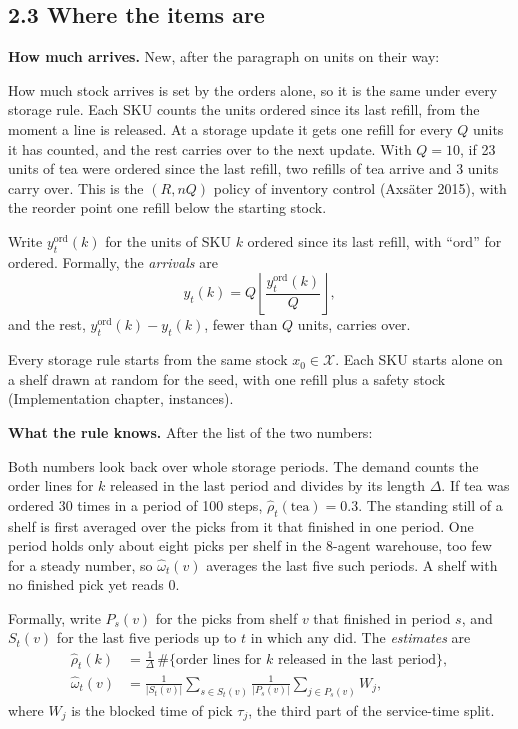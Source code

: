 \documentclass[11pt,a4paper]{article}
\newenvironment{greenblock}{\color{newc}}{}
\begin{document}
\subsection*{2.3 Where the items are}

\textbf{How much arrives.} New, after the paragraph on units on their way:

\begin{greenblock}
How much stock arrives is set by the orders alone, so it is the same under
every storage rule. Each SKU counts the units ordered since its last refill,
from the moment a line is released. At a storage update it gets one refill
for every $Q$ units it has counted, and the rest carries over to the next
update. With $Q=10$, if 23 units of tea were ordered since the last refill,
two refills of tea arrive and 3 units carry over. This is the $(R,nQ)$
policy of inventory control (Axs\"ater 2015), with the reorder point one
refill below the starting stock.

Write $y^{\mathrm{ord}}_t(k)$ for the units of SKU $k$ ordered since its
last refill, with ``ord'' for ordered. Formally, the \emph{arrivals} are
\[
  y_t(k) = Q \left\lfloor \frac{y^{\mathrm{ord}}_t(k)}{Q} \right\rfloor ,
  \tag{arrivals}
\]
and the rest, $y^{\mathrm{ord}}_t(k)-y_t(k)$, fewer than $Q$ units, carries
over.

Every storage rule starts from the same stock $x_0\in\mathcal{X}$. Each SKU
starts alone on a shelf drawn at random for the seed, with one refill plus a
safety stock (Implementation chapter, instances).
\end{greenblock}

\textbf{What the rule knows.} After the list of the two numbers:

\begin{greenblock}
Both numbers look back over whole storage periods. The demand counts the
order lines for $k$ released in the last period and divides by its length
$\Delta$. If tea was ordered 30 times in a period of 100 steps,
$\hat\rho_t(\mathrm{tea})=0.3$. The standing still of a shelf is first
averaged over the picks from it that finished in one period. One period
holds only about eight picks per shelf in the 8-agent warehouse, too few for
a steady number, so $\hat\omega_t(v)$ averages the last five such periods. A
shelf with no finished pick yet reads 0.

Formally, write $P_s(v)$ for the picks from shelf $v$ that finished in
period $s$, and $S_t(v)$ for the last five periods up to $t$ in which any
did. The \emph{estimates} are
\[
  \begin{aligned}
  \hat\rho_t(k) &= \tfrac{1}{\Delta}\,\#\{\text{order lines for } k
    \text{ released in the last period}\}, \\
  \hat\omega_t(v) &= \frac{1}{|S_t(v)|}\sum_{s \in S_t(v)}
    \frac{1}{|P_s(v)|}\sum_{j \in P_s(v)} W_j ,
  \end{aligned}
  \tag{estimates}
\]
where $W_j$ is the blocked time of pick $\tau_j$, the third part of the
service-time split.
\end{greenblock}
\end{document}
